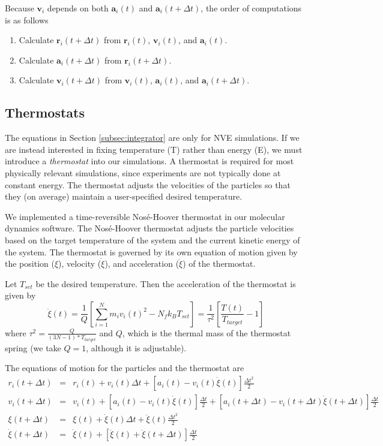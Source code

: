 \documentclass[12pt]{article}
\begin{document}
Because $\mathbf{v}_i$ depends on both $\mathbf{a}_i(t)$ and $\mathbf{a}_i(t+\Delta t)$, the order of computations is as follows
\begin{enumerate}
\item Calculate $\mathbf{r}_i(t + \Delta t)$ from $\mathbf{r}_i(t)$, $\mathbf{v}_i(t)$, and $\mathbf{a}_i(t)$.
\item Calculate $\mathbf{a}_i(t + \Delta t)$ from $\mathbf{r}_i(t + \Delta t)$.
\item Calculate $\mathbf{v}_i(t + \Delta t)$ from $\mathbf{v}_i(t)$, $\mathbf{a}_i(t)$, and $\mathbf{a}_i(t + \Delta t)$.
\end{enumerate}

\subsection{Thermostats} \label{subsec:thermostat}
The equations in Section \ref{subsec:integrator} are only for NVE simulations.
%
If we are instead interested in fixing temperature (T) rather than energy (E), we must introduce a {\em thermostat} into our simulations.
%
A thermostat is required for most physically relevant simulations, since experiments are not typically done at constant energy.
%
The thermostat adjusts the velocities of the particles so that they (on average) maintain a user-specified desired temperature.

We implemented a time-reversible Nos\'{e}-Hoover thermostat in our molecular dynamics software.
%
The Nos\'{e}-Hoover thermostat adjusts the particle velocities based on the target temperature of the system and the current kinetic energy of the system.
%
The thermostat is governed by its own equation of motion given by the position ($\xi$), velocity ($\dot{\xi}$), and acceleration ($\ddot{\xi}$) of the thermostat.

Let $T_{set}$ be the desired temperature.
%
Then the acceleration of the thermostat is given by
\begin{equation}
\ddot{\xi}(t) = \frac{1}{Q} \left[ \sum_{i=1}^{N} m_i v_i(t)^2 - N_f k_B T_{set} \right] = \frac{1}{\tau^{2}} \left[\frac{T(t)}{T_{target}} -1 \right]
\end{equation}
where $\tau^{2} = \frac{Q}{(3N-1)*T_{target}}$ and $Q$, which is the thermal mass of the thermostat spring (we take $Q=1$, although it is adjustable).

The equations of motion for the particles and the thermostat are
\small
\begin{eqnarray}
r_i(t + \Delta t) &=& r_i(t) + v_i(t) \Delta t + \left[ a_i(t) - v_i(t)\dot{\xi}(t) \right] \frac{\Delta t^2}{2}\\
v_i(t + \Delta t) &=& v_i(t) + \left[ a_i(t) - v_i(t) \dot{\xi}(t) \right] \frac{\Delta t}{2} + \left[a_i(t + \Delta t)  - v_i(t + \Delta t) \dot{\xi}(t + \Delta t) \right] \frac{\Delta t}{2} \\
\xi(t + \Delta t) & = & \xi(t) + \dot{\xi}(t) \Delta t + \ddot{\xi}(t) \frac{\Delta t^2 }{2} \\
\dot{\xi}(t + \Delta t)  & = & \dot{\xi}(t) + \left[ \ddot{\xi}(t) + \ddot{\xi} (t + \Delta t)  \right] \frac{\Delta t}{2}
\end{eqnarray}
\normalsize
\end{document}
